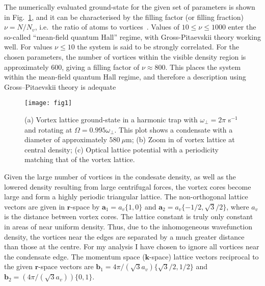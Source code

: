 The numerically evaluated ground-state for the given set of parameters is shown in Fig.~\ref{fig:vlatt_gnd}, and it can be characterised by the filling factor (or filling fraction) $\nu=N/N_v$, i.e.~the ratio of atoms to vortices~\cite{BEC:Fetter_revmodphys_2009}. Values of $10 \leq \nu \leq 1000$ enter the so-called ``mean-field quantum Hall'' regime, with Gross-Pitaevskii theory working well. For values $\nu \leq 10$ the system is said to be strongly correlated. For the chosen parameters, the number of vortices within the visible density region is approximately 600, giving a filling factor of $\nu \approx 800 $. This places the system within the mean-field quantum Hall regime, and therefore a description using Gross--Pitaevskii theory is adequate~\cite{Vtx:Schweikhard_prl_2004}

\begin{figure}[tb]
    \texttt{[image: fig1]}
    \caption{(a) Vortex lattice ground-state in a harmonic trap with $\omega_\perp=2\pi$ s$^{-1}$ and rotating at $\Omega=0.995\omega_\perp$. This plot shows a condensate with a diameter of approximately $580~\mu\textrm{m}$; (b) Zoom in of vortex lattice at central density; (c) Optical lattice potential with a periodicity matching that of the vortex lattice.}
    \label{fig:vlatt_gnd}
\end{figure}

Given the large number of vortices in the condesate density, as well as the lowered density resulting from large centrifugal forces, the vortex cores become large and form a highly periodic triangular lattice. The non-orthogonal lattice vectors are given in $\mathbf{r}$-space by $\mathbf{a}_1 = a_v\{1,0\}$ and $\mathbf{a}_2 = a_v\{-1/2, \sqrt{3}/2\}$, where $a_v$ is the distance between vortex cores. The lattice constant is truly only constant in areas of near uniform density. Thus, due to the inhomogeneous wavefunction density, the vortices near the edges are separated by a much greater distance than those at the centre. For my analysis I have chosen to ignore all vortices near the condensate edge. The momentum space ($\mathbf{k}$-space) lattice vectors reciprocal to the given $\mathbf{r}$-space vectors are $\mathbf{b}_1 = 4\pi/(\sqrt{3}a_v)\{\sqrt{3}/2,1/2\}$ and $\mathbf{b}_2 = (4\pi/(\sqrt{3}a_v))\{0,1\}$.





